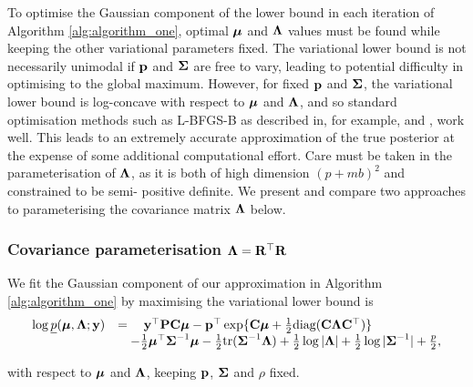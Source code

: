 To optimise the Gaussian component of the lower bound in each iteration of
Algorithm \ref{alg:algorithm_one}, optimal ${\boldsymbol \mu}$ and ${\boldsymbol \Lambda}$ values must be
found while keeping the other variational parameters fixed. The variational
lower bound is not necessarily unimodal if ${\bf p}$ and ${\boldsymbol \Sigma}$ are free to
vary, leading to potential difficulty in optimising to the global maximum.
However, for fixed ${\bf p}$ and ${\boldsymbol \Sigma}$, the variational lower bound is
log-concave with respect to ${\boldsymbol \mu}$ and ${\boldsymbol \Lambda}$, and so standard optimisation
methods such as L-BFGS-B as described in, for example, \cite{Liu1989} and
\cite{Nocedal2006}, work well. This leads to an extremely accurate
approximation of the true posterior at the expense of some additional
computational effort. Care must be taken in the parameterisation of ${\boldsymbol \Lambda}$,
as it is both of high dimension $(p + mb)^2$ and constrained to be semi-
positive definite. We present and compare two approaches to parameterising the
covariance matrix ${\boldsymbol \Lambda}$ below.
	
\subsubsection{Covariance parameterisation ${\boldsymbol \Lambda} = {\bf R}^\top {\bf R}$}
We fit the Gaussian component of our approximation in Algorithm
\ref{alg:algorithm_one} by maximising  the variational lower bound is
\begin{equation}
\label{eq:gva_lower_bound}
\begin{array}{ll}
	\log \underline{p}({\boldsymbol \mu}, {\boldsymbol \Lambda}; {\bf y}) & = \quad {\bf y}^\top{\bf P} {\bf C} {\boldsymbol\mu} - {\bf p}^\top \exp\{{\bf C} {\boldsymbol \mu} + \tfrac{1}{2} \text{diag}({\bf C} {\boldsymbol \Lambda} {\bf C}^\top)\} \\
    & \quad - \tfrac{1}{2} {\boldsymbol \mu}^\top {\boldsymbol\Sigma}^{-1} {\boldsymbol \mu} - \tfrac{1}{2} \text{tr}{({\boldsymbol\Sigma}^{-1} {\boldsymbol\Lambda})} + \tfrac{1}{2} \log{|{\boldsymbol\Lambda}|} + \tfrac{1}{2} \log{|{\boldsymbol\Sigma}^{-1}|}  + \tfrac{p}{2},
\end{array}
\end{equation}

\noindent with respect to ${\boldsymbol \mu}$ and ${\boldsymbol \Lambda}$, keeping ${\bf p}$, ${\boldsymbol \Sigma}$ and
$\rho$ fixed.
		
